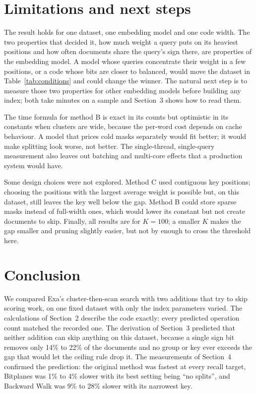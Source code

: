 \section{Limitations and next steps}
The result holds for one dataset, one embedding model and one code width. The two
properties that decided it, how much weight a query puts on its heaviest positions and how
often documents share the query's sign there, are properties of the embedding model. A
model whose queries concentrate their weight in a few positions, or a code whose bits are
closer to balanced, would move the dataset in Table~\ref{tab:conditions} and could change
the winner. The natural next step is to measure those two properties for other embedding
models before building any index; both take minutes on a sample and Section~3 shows how to
read them.

The time formula for method B is exact in its counts but optimistic in its constants when
clusters are wide, because the per-word cost depends on cache behaviour. A model that
prices cold masks separately would fit better; it would make splitting look worse, not
better. The single-thread, single-query measurement also leaves out batching and
multi-core effects that a production system would have.

Some design choices were not explored. Method C used contiguous key positions; choosing the
positions with the largest average weight is possible but, on this dataset, still leaves
the key well below the gap. Method B could store sparse masks instead of full-width ones,
which would lower its constant but not create documents to skip. Finally, all results are
for $K=100$; a smaller $K$ makes the gap smaller and pruning slightly easier, but not by
enough to cross the threshold here.

\section{Conclusion}
We compared Exa's cluster-then-scan search with two additions that try to skip scoring
work, on one fixed dataset with only the index parameters varied. The calculations of
Section~2 describe the code exactly: every predicted operation count matched the recorded
one. The derivation of Section~3 predicted that neither addition can skip anything on this
dataset, because a single sign bit removes only 14\% to 22\% of the documents and no group
or key ever exceeds the gap that would let the ceiling rule drop it. The measurements of
Section~4 confirmed the prediction: the original method was fastest at every recall target,
Bitplanes was 1\% to 4\% slower with its best setting being ``no splits'', and Backward
Walk was 9\% to 28\% slower with its narrowest key.

